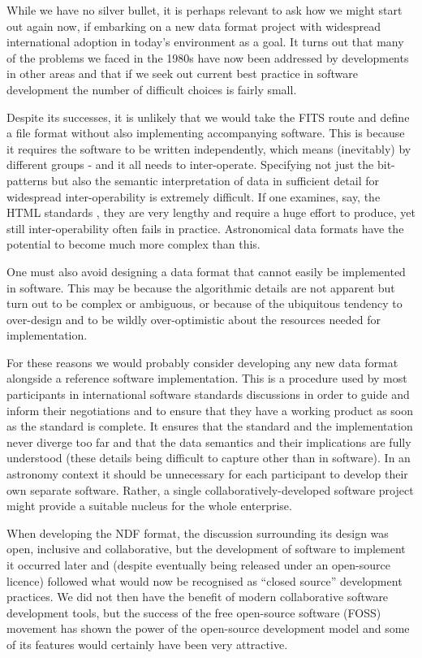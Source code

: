 \documentclass[final,authoryear,5p,times,twocolumn]{elsarticle}
\begin{document}
While we have no silver bullet, it is perhaps relevant to ask how we
might start out again now, if embarking on a new data format project
with widespread international adoption in today's environment as a
goal. It turns out that many of the problems we faced in the 1980s
have now been addressed by developments in other areas and that if we
seek out current best practice in software development the number of
difficult choices is fairly small.

Despite its successes, it is unlikely that we would take the FITS
route and define a file format without also implementing accompanying
software. This is because it requires the software to be written
independently, which means (inevitably) by different groups - and it
all needs to inter-operate. Specifying not just the bit-patterns but
also the semantic interpretation of data in sufficient detail for
widespread inter-operability is extremely difficult. If one examines,
say, the HTML standards \citep{w3chtml5}, they are very
lengthy and require a huge effort to produce, yet still
inter-operability often fails in practice. Astronomical data formats
have the potential to become much more complex than this.

One must also avoid designing a data format that cannot easily be
implemented in software. This may be because the algorithmic details
are not apparent but turn out to be complex or ambiguous, or because
of the ubiquitous tendency to over-design and to be wildly
over-optimistic about the resources needed for implementation.

For these reasons we would probably consider developing any new data
format alongside a reference software implementation. This is a
procedure used by most participants in international software
standards discussions in order to guide and inform their negotiations
and to ensure that they have a working product as soon as the standard
is complete. It ensures that the standard and the implementation never
diverge too far and that the data semantics and their implications are
fully understood (these details being difficult to capture other than
in software). In an astronomy context it should be unnecessary for
each participant to develop their own separate software. Rather, a
single collaboratively-developed software project might provide a
suitable nucleus for the whole enterprise.

When developing the NDF format, the discussion surrounding its design
was open, inclusive and collaborative, but the development of software
to implement it occurred later and (despite eventually being released
under an open-source licence) followed what would now be recognised as
``closed source'' development practices. We did not then have the
benefit of modern collaborative software development tools, but the
success of the free open-source software (FOSS) movement has shown the
power of the open-source development model and some of its features
would certainly have been very attractive.
\end{document}
